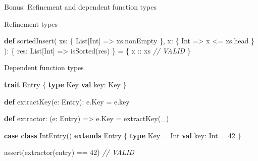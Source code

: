 \documentclass[
  ignorenonframetext,
]{beamer}
\newenvironment{Shaded}{}{}
\newcommand{\CommentTok}[1]{\textcolor[rgb]{0.38,0.63,0.69}{\textit{#1}}}
\newcommand{\DecValTok}[1]{\textcolor[rgb]{0.25,0.63,0.44}{#1}}
\newcommand{\FunctionTok}[1]{\textcolor[rgb]{0.02,0.16,0.49}{#1}}
\newcommand{\KeywordTok}[1]{\textcolor[rgb]{0.00,0.44,0.13}{\textbf{#1}}}
\newcommand{\NormalTok}[1]{#1}
\begin{document}
\begin{frame}[fragile]{Bonus: Refinement and dependent function types}
\protect\hypertarget{bonus-refinement-and-dependent-function-types}{}

\begin{block}{Refinement types}

\begin{Shaded}
\begin{Highlighting}[]
\KeywordTok{def} \FunctionTok{sortedInsert}\NormalTok{(}
\NormalTok{  xs: \{ List[Int] => xs.}\FunctionTok{nonEmpty}\NormalTok{ \},}
\NormalTok{  x:  \{ Int => x <= xs.}\FunctionTok{head}\NormalTok{ \}}
\NormalTok{): \{ res: List[Int] => }\FunctionTok{isSorted}\NormalTok{(res) \} = \{}
\NormalTok{  x :: xs }\CommentTok{// VALID}
\NormalTok{\}}
\end{Highlighting}
\end{Shaded}

\end{block}

\begin{block}{Dependent function types}

\begin{Shaded}
\begin{Highlighting}[]
\KeywordTok{trait}\NormalTok{ Entry \{}
  \KeywordTok{type}\NormalTok{ Key}
  \KeywordTok{val}\NormalTok{ key: Key}
\NormalTok{\}}

\KeywordTok{def} \FunctionTok{extractKey}\NormalTok{(e: Entry): e.}\FunctionTok{Key}\NormalTok{ = e.}\FunctionTok{key}

\KeywordTok{def}\NormalTok{ extractor: (e: Entry) => e.}\FunctionTok{Key}\NormalTok{ = }\FunctionTok{extractKey}\NormalTok{(_)}
\end{Highlighting}
\end{Shaded}

\end{block}

\end{frame}

\begin{frame}[fragile]

\begin{Shaded}
\begin{Highlighting}[]
\KeywordTok{case} \KeywordTok{class} \FunctionTok{IntEntry}\NormalTok{() }\KeywordTok{extends}\NormalTok{ Entry \{}
  \KeywordTok{type}\NormalTok{ Key = Int}
  \KeywordTok{val}\NormalTok{ key: Int = }\DecValTok{42}
\NormalTok{\}}

\FunctionTok{assert}\NormalTok{(}\FunctionTok{extractor}\NormalTok{(entry) == }\DecValTok{42}\NormalTok{) }\CommentTok{// VALID}
\end{Highlighting}
\end{Shaded}

\end{frame}
\end{document}
